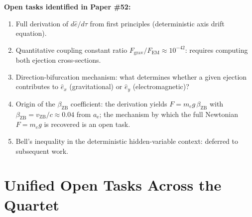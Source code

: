 \documentclass[12pt,letterpaper]{article}
\newcommand{\paperno}[1]{\textbf{\#{}#1}}
\newcommand{\vZB}{v_{\mathrm{ZB}}}
\newcommand{\anom}{a_{\mathrm{e}}}
\newcommand{\ehat}[1]{\hat{e}_{#1}}
\newcommand{\betaZB}{\beta_{\mathrm{ZB}}}
\begin{document}
\begin{mdframed}[style=openbox]
\textbf{Open tasks identified in Paper \paperno{52}:}
\begin{enumerate}[label=(\roman*), leftmargin=2em]
  \item Full derivation of $d\hat{e}/d\tau$ from first principles (deterministic axis drift equation).
  \item Quantitative coupling constant ratio $F_{\mathrm{grav}}/F_{\mathrm{EM}}\approx10^{-42}$: requires computing both ejection cross-sections.
  \item Direction-bifurcation mechanism: what determines whether a given ejection contributes to $\ehat{x}$ (gravitational) or $\ehat{y}$ (electromagnetic)?
  \item Origin of the $\betaZB$ coefficient: the derivation yields $F = m_e g\,\betaZB$ with $\betaZB = \vZB/c\approx 0.04$ from $\anom$; the mechanism by which the full Newtonian $F = m_e g$ is recovered is an open task.
  \item Bell's inequality in the deterministic hidden-variable context: deferred to subsequent work.
\end{enumerate}
\end{mdframed}

\clearpage

\section{\texorpdfstring{Unified Open Tasks Across the Quartet}{Unified Open Tasks Across the Quartet}}
\label{sec:open}
\end{document}
